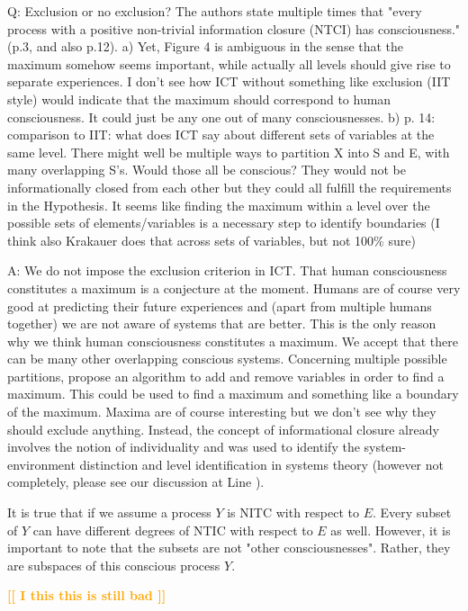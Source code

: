 \documentclass[utf8]{article}
\newcounter{cQuestion}[section]
\newenvironment{question}
    {\refstepcounter{cQuestion}\color{Blue}\noindent\newline Q\thecQuestion:}
    {~\newline}
\newenvironment{ans}  
    {\color{Black}\noindent A:}
    {~\newline}
\newcommand{\toWrite}[1]{\noindent
	\textcolor{Orange}{\textbf{[[ #1 ]]}}}
\begin{document}
        
        
        \begin{question}
            Exclusion or no exclusion? The authors state multiple times that "every process with a positive non-trivial information closure (NTCI) has consciousness." (p.3, and also p.12).
            a) Yet, Figure 4 is ambiguous in the sense that the maximum somehow seems important, while actually all levels should give rise to separate experiences. I don't see how ICT without something like exclusion (IIT style) would indicate that the maximum should correspond to human consciousness. It could just be any one out of many consciousnesses.
            b) p. 14: comparison to IIT: what does ICT say about different sets of variables at the same level. There might well be multiple ways to partition X into S and E, with many overlapping S's. Would those all be conscious? They would not be informationally closed from each other but they could all fulfill the requirements in the Hypothesis. It seems like finding the maximum within a level over the possible sets of elements/variables is a necessary step to identify boundaries (I think also Krakauer does that across sets of variables, but not 100\% sure)        
        \end{question}
    
    	\begin{ans}
			We do not impose the exclusion criterion in ICT. That human consciousness constitutes a maximum is a conjecture at the moment. Humans are of course very good at predicting their future experiences and (apart from multiple humans together) we are not aware of systems that are better. This is the only reason why we think human consciousness constitutes a maximum. We accept that there can be many other overlapping conscious systems. Concerning multiple possible partitions, \citet{krakauer2014information} propose an algorithm to add and remove variables in order to find a maximum. This could be used to find a maximum and something like a boundary of the maximum. Maxima are of course interesting but we don't see why they should exclude anything.   Instead, the concept of informational closure already involves the notion of individuality and was used to identify the system-environment distinction \citep{BERTSCHINGER.2006} and level identification \citep{PFANTE.2014} in systems theory (however not completely, please see our discussion at Line ).
			
			It is true that if we assume a process $Y$ is NITC with respect to $E$. Every subset of $Y$ can have different degrees of NTIC with respect to $E$ as well. However, it is important to note that the subsets are not "other consciousnesses". Rather, they are subspaces of this conscious process $Y$.
			
			\toWrite{I this this is still bad}
			
    	\end{ans}
\end{document}
